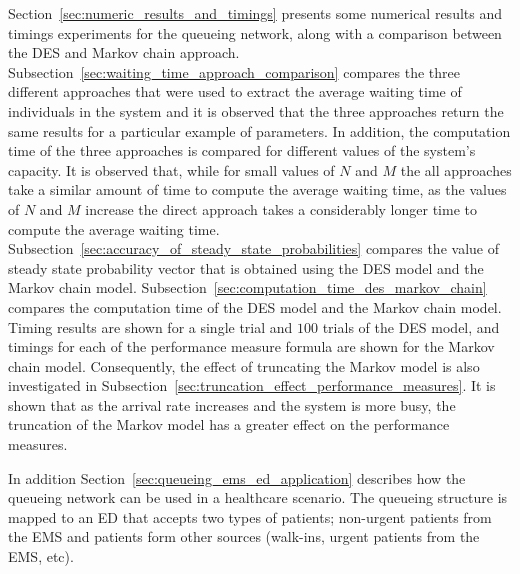 Section~\ref{sec:numeric_results_and_timings} presents some numerical
results and timings experiments for the queueing network, along with
a comparison between the DES and Markov chain approach.
Subsection~\ref{sec:waiting_time_approach_comparison} compares the three
different approaches that were used to extract the average waiting time of
individuals in the system and it is observed that the three approaches return
the same results for a particular example of parameters.
In addition, the computation time of the three approaches is compared for
different values of the system's capacity.
It is observed that, while for small values of \(N\) and \(M\) the all
approaches take a similar amount of time to compute the average waiting time,
as the values of \(N\) and \(M\) increase the direct approach takes a
considerably longer time to compute the average waiting time.
Subsection~\ref{sec:accuracy_of_steady_state_probabilities} compares the
value of steady state probability vector that is obtained using the
DES model and the Markov chain model.
Subsection~\ref{sec:computation_time_des_markov_chain} compares the
computation time of the DES model and the Markov chain model.
Timing results are shown for a single trial and \(100\) trials of the DES
model, and timings for each of the performance measure formula are shown for
the Markov chain model.
Consequently, the effect of truncating the Markov model is also investigated
in Subsection~\ref{sec:truncation_effect_performance_measures}.
It is shown that as the arrival rate increases and the system is more busy,
the truncation of the Markov model has a greater effect on the performance
measures.

In addition Section~\ref{sec:queueing_ems_ed_application} describes how the
queueing network can be used in a healthcare scenario.
The queueing structure is mapped to an ED that accepts two types of patients;
non-urgent patients from the EMS and patients form other sources
(walk-ins, urgent patients from the EMS, etc).
